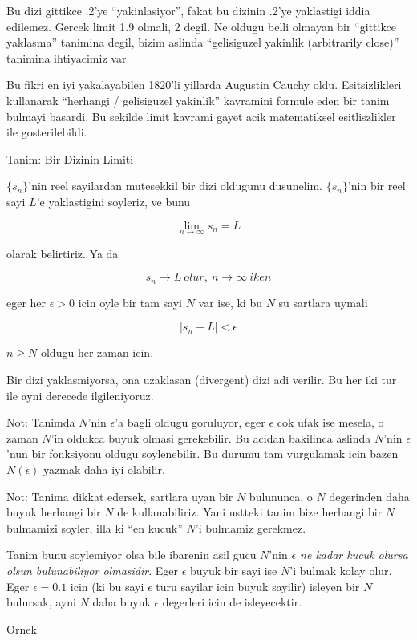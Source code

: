 \documentclass[12pt,fleqn]{article}
\begin{document}
Bu dizi gittikce .2'ye ``yakinlasiyor'', fakat bu dizinin .2'ye yaklastigi
iddia edilemez. Gercek limit 1.9 olmali, 2 degil. Ne oldugu belli olmayan
bir ``gittikce yaklasma'' tanimina degil, bizim aslinda ``gelisiguzel
yakinlik (arbitrarily close)'' tanimina ihtiyacimiz var.

Bu fikri en iyi yakalayabilen 1820'li yillarda Augustin Cauchy
oldu. Esitsizlikleri kullanarak ``herhangi / gelisiguzel yakinlik''
kavramini formule eden bir tanim bulmayi basardi. Bu sekilde limit kavrami
gayet acik matematiksel esitliszlikler ile gosterilebildi.

Tanim: Bir Dizinin Limiti 

$\{s_n\}$'nin reel sayilardan mutesekkil bir dizi oldugunu
dusunelim. $\{s_n\}$'nin bir reel sayi $L$'e yaklastigini soyleriz, ve bunu

\[ \lim_{n\to\infty} s_n = L \]

olarak belirtiriz. Ya da

\[ s_n \to L \ olur, \ n \to \infty \ iken \]

eger her $\epsilon > 0$ icin oyle bir tam sayi $N$ var ise, ki bu $N$ su
sartlara uymali

\[ |s_n - L| < \epsilon  \]

$n \ge N$ oldugu her zaman icin. 

Bir dizi yaklasmiyorsa, ona uzaklasan (divergent) dizi adi verilir. Bu her
iki tur ile ayni derecede ilgileniyoruz. 

Not: Tanimda $N$'nin $\epsilon$'a bagli oldugu goruluyor, eger $\epsilon$
cok ufak ise mesela, o zaman $N$'in oldukca buyuk olmasi
gerekebilir. Bu acidan bakilinca aslinda $N$'nin $\epsilon$'nun bir
fonksiyonu oldugu soylenebilir. Bu durumu tam vurgulamak icin bazen
$N(\epsilon)$ yazmak daha iyi olabilir. 

Not: Tanima dikkat edersek, sartlara uyan bir $N$ bulununca, o $N$
degerinden daha buyuk herhangi bir $N$ de kullanabiliriz. Yani ustteki
tanim bize herhangi bir $N$ bulmamizi soyler, illa ki ``en kucuk'' $N$'i
bulmamiz gerekmez. 

Tanim bunu soylemiyor olsa bile ibarenin asil gucu $N$'nin {\em $\epsilon$
  ne kadar kucuk olursa olsun bulunabiliyor olmasidir}. Eger $\epsilon$
buyuk bir sayi ise $N$'i bulmak kolay olur. Eger $\epsilon = 0.1$ icin (ki
bu sayi $\epsilon$ turu sayilar icin buyuk sayilir) isleyen bir $N$
bulursak, ayni $N$ daha buyuk  $\epsilon$ degerleri icin de isleyecektir. 

Ornek 
\end{document}
